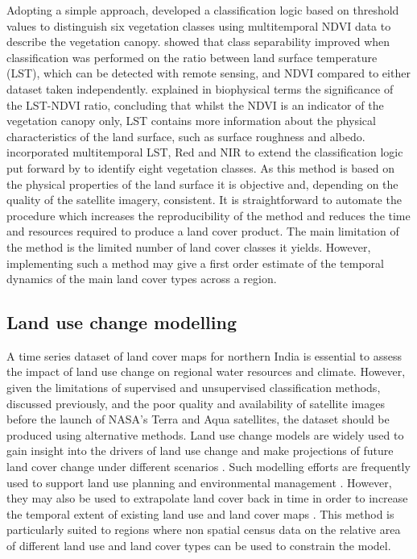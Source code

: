 \documentclass{icldt}\usepackage[]{graphicx}\usepackage[]{color}
\begin{document}
Adopting a simple approach, \citet{Running1995} developed a classification logic based on threshold values to distinguish six vegetation classes using multitemporal NDVI data to describe the vegetation canopy. \citet{Lambin1995} showed that class separability improved when classification was performed on the ratio between land surface temperature (LST), which can be detected with remote sensing, and NDVI compared to either dataset taken independently. \citet{Lambin1996} explained in biophysical terms the significance of the LST-NDVI ratio, concluding that whilst the NDVI is an indicator of the vegetation canopy only, LST contains more information about the physical characteristics of the land surface, such as surface roughness and albedo. \citet{Nemani1997} incorporated multitemporal LST, Red and NIR to extend the classification logic put forward by \citet{Running1995} to identify eight vegetation classes. As this method is based on the physical properties of the land surface it is objective and, depending on the quality of the satellite imagery, consistent. It is straightforward to automate the procedure which increases the reproducibility of the method and reduces the time and resources required to produce a land cover product. The main limitation of the method is the limited number of land cover classes it yields. However, implementing such a method may give a first order estimate of the temporal dynamics of the main land cover types across a region. \\

%

\subsection{Land use change modelling}

A time series dataset of land cover maps for northern India is essential to assess the impact of land use change on regional water resources and climate. However, given the limitations of supervised and unsupervised classification methods, discussed previously, and the poor quality and availability of satellite images before the launch of NASA's Terra and Aqua satellites, the dataset should be produced using alternative methods. Land use change models are widely used to gain insight into the drivers of land use change and make projections of future land cover change under different scenarios \citep{Veldkamp2001}. Such modelling efforts are frequently used to support land use planning and environmental management \citep{Verburg2002}. However, they may also be used to extrapolate land cover back in time in order to increase the temporal extent of existing land use and land cover maps \citep{Verburg2002}. This method is particularly suited to regions where non spatial census data on the relative area of different land use and land cover types can be used to constrain the model. \\ 
\end{document}
